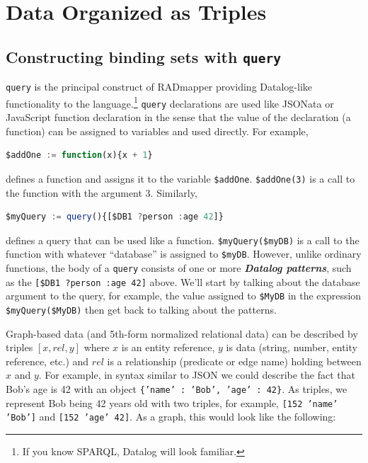\documentclass[10pt,letterpaper]{article} %
\newcommand{\stt}[1]{\texttt{#1}} %
\newcommand{\bdef}[1]{\textbf{\textit{#1}}}
\begin{document}
\section{Data Organized as Triples}
 \label{sec:query}

\subsection{Constructing binding sets with \stt{query}}

\stt{query} is the principal construct of RADmapper providing Datalog-like functionality to the language.\footnote{
  If you know SPARQL, Datalog will look familiar.}
\stt{query} declarations are used like JSONata or JavaScript function declaration in the sense that the value of the declaration (a function) can be assigned to variables and used directly.
For example,
\begin{lstlisting}[language=JavaScript,numbers=none,basicstyle=\ttfamily\scriptsize]
$addOne := function(x){x + 1}
\end{lstlisting} \vspace{-2em}
defines a function and assigns it to the variable \stt{\$addOne}.
\stt{\$addOne(3)} is a call to the function with the argument 3.
Similarly,
\begin{lstlisting}[language=JavaScript,numbers=none,basicstyle=\ttfamily\scriptsize]
$myQuery := query(){[$DB1 ?person :age 42]}
\end{lstlisting} \vspace{-2em}
defines a query that can be used like a function.
\stt{\$myQuery(\$myDB)} is a call to the function with whatever ``database'' is assigned to \stt{\$myDB}.
However, unlike ordinary functions, the body of a \stt{query} consists of one or more \bdef{Datalog patterns}, such as the \stt{[\$DB1 ?person :age 42]} above.
We'll start by talking about the database argument to the query, for example, the value assigned to \stt{\$MyDB} in the expression \stt{\$myQuery(\$MyDB)} then get back to talking about the patterns.

Graph-based data (and 5th-form normalized relational data) can be described by triples $[x,rel,y]$ where $x$ is an entity reference, $y$ is data (string, number, entity reference, etc.) and $rel$ is a relationship (predicate or edge name) holding between $x$ and $y$.
For example, in syntax similar to JSON we could describe the fact that Bob's age is 42 with an object \stt{\{'name' : 'Bob', 'age' : 42\}}.
As triples, we represent Bob being 42 years old with two triples, for example, \stt{[152 'name' 'Bob']} and \stt{[152 'age' 42]}.
As a graph, this would look like the following:
\end{document}

